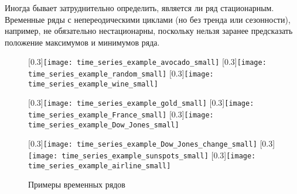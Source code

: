 Иногда бывает затруднительно определить, является ли ряд стационарным. Временные ряды с 
непереодическими циклами (но без тренда или сезонности), например, не обязательно нестационарны, поскольку 
нельзя заранее предсказать положение максимумов и минимумов ряда.

\begin{figure}[h!]
    \centering
    [0.3\textwidth]{\texttt{[image: time\_series\_example\_avocado\_small]}}
    \hfill
    [0.3\textwidth]{\texttt{[image: time\_series\_example\_random\_small]}}
    \hfill
    [0.3\textwidth]{\texttt{[image: time\_series\_example\_wine\_small]}}
    
    \vspace{0.5cm}
    [0.3\textwidth]{\texttt{[image: time\_series\_example\_gold\_small]}}
    \hfill
    [0.3\textwidth]{\texttt{[image: time\_series\_example\_France\_small]}}
    \hfill
    [0.3\textwidth]{\texttt{[image: time\_series\_example\_Dow\_Jones\_small]}}
    
    \vspace{0.5cm}
    [0.3\textwidth]{\texttt{[image: time\_series\_example\_Dow\_Jones\_change\_small]}}
    \hfill
    [0.3\textwidth]{\texttt{[image: time\_series\_example\_sunspots\_small]}}
    \hfill
    [0.3\textwidth]{\texttt{[image: time\_series\_example\_airline\_small]}}

    \caption{Примеры временных рядов}
    \label{fig:time_series_examples}
\end{figure}

